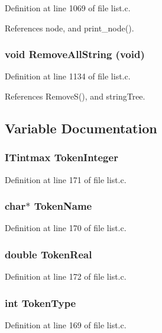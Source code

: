Definition at line 1069 of file list.c.

References node, and print\_\-node().
\subsubsection{\setlength{\rightskip}{0pt plus 5cm}void Remove\-All\-String (void)}\label{list_8h_97b45e81cc84997054eed9934dc0ef06}




Definition at line 1134 of file list.c.

References Remove\-S(), and string\-Tree.

\subsection{Variable Documentation}
\subsubsection{\setlength{\rightskip}{0pt plus 5cm}\bf{ITintmax} \bf{Token\-Integer}}\label{list_8h_a05a98db4e5f1adf600353b409c73337}




Definition at line 171 of file list.c.
\subsubsection{\setlength{\rightskip}{0pt plus 5cm}char$\ast$ \bf{Token\-Name}}\label{list_8h_285ec8e248204d1c7093e162ff8a9cf3}




Definition at line 170 of file list.c.
\subsubsection{\setlength{\rightskip}{0pt plus 5cm}double \bf{Token\-Real}}\label{list_8h_433b5350d88710b59c923b53834edf5c}




Definition at line 172 of file list.c.
\subsubsection{\setlength{\rightskip}{0pt plus 5cm}int \bf{Token\-Type}}\label{list_8h_58872325a7ea09786c3253d71a4ea503}




Definition at line 169 of file list.c.